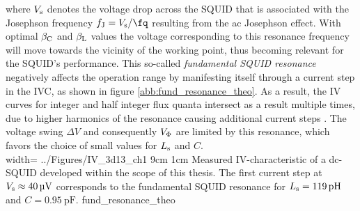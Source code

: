 
where $V_{\rm s}$ denotes the voltage drop across the SQUID that is associated with the Josephson frequency $f_{\rm J}=V_{\rm s}/{\unit{\fq}}$ resulting from the ac Josephson effect. With optimal $\beta_{\rm C}$ and $\beta_{\rm L}$ values the voltage corresponding to this resonance frequency will move towards the vicinity of the working point, thus becoming relevant for the SQUID's performance.
This so-called \textit{fundamental SQUID resonance} negatively affects the operation range by manifesting itself through a current step in the IVC, as shown in figure \ref{abb:fund_resonance_theo}. As a result, the IV curves for integer and half integer flux quanta intersect as a result multiple times, due to higher harmonics of the resonance causing additional current steps \cite{Clarke2004}. The voltage swing $\Delta V$ and consequently $V_{\rm \Phi}$ are limited by this resonance, which favors the choice of small values for $L_{\rm s}$ and $C$. \\

{width=\textwidth}
{../Figures/IV_3d13_ch1}
{9cm}
{1cm}
{Measured IV-characteristic of a dc-SQUID developed within the scope of this thesis. The first current step at $V_{\rm s}\approx \qty{40}{\uV}$ corresponds to the fundamental SQUID resonance for $L_{\rm s}=\qty{119}{\pH}$ and $C=\qty{0.95}{\pF}$.}
{fund_resonance_theo}

